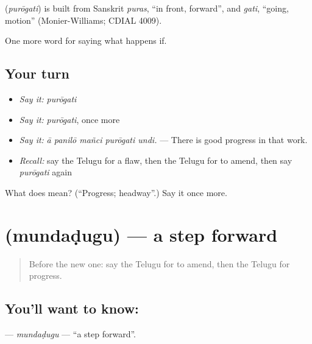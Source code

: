 \begin{cousinweb}
\textbf{} (\emph{purōgati}) is built from Sanskrit \emph{puras}, \textquotedblleft{}in front, forward\textquotedblright{}, and \emph{gati}, \textquotedblleft{}going, motion\textquotedblright{} (Monier-Williams; CDIAL 4009).
\end{cousinweb}

\begin{grammarlens}[title={What you've built}]
One more word for saying what happens if.
\end{grammarlens}

\subsection*{Your turn}
\begin{itemize}
\raggedright
  \item \emph{Say it:} \emph{purōgati}
  \item \emph{Say it:} \emph{purōgati}, once more
  \item \emph{Say it:} \emph{ā panilō mañci purōgati undi.} — There is good progress in that work.
  \item \emph{Recall:} say the Telugu for a flaw, then the Telugu for to amend, then say \emph{purōgati} again
\end{itemize}

\begin{tcolorbox}[breakable,colback=teal!4,colframe=teal!35!black,title={Before you move on}]
What does  mean? (\textquotedblleft{}Progress; headway\textquotedblright{}.) Say it once more.
\end{tcolorbox}
\section[\texorpdfstring{\te{ముందడుగు} (mundaḍugu)}{ముందడుగు (mundaḍugu)}]{ (mundaḍugu) — a step forward}

\label{lesson:TE-C429-mundadugu}



\begin{quote}
Before the new one: say the Telugu for to amend, then the Telugu for progress.
\end{quote}

\subsection*{You'll want to know: }
\textbf{} — \emph{mundaḍugu} — \textquotedblleft{}a step forward\textquotedblright{}.

